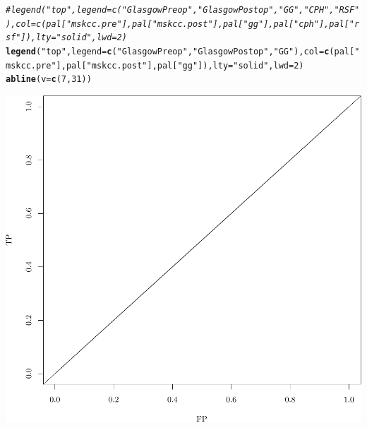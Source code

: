 \documentclass{article}\usepackage[]{graphicx}\usepackage[]{color}
\makeatletter
\def\maxwidth{ %
  \ifdim\Gin@nat@width>\linewidth
    \linewidth
  \else
    \Gin@nat@width
  \fi
}
\newcommand{\hlnum}[1]{\textcolor[rgb]{0.686,0.059,0.569}{#1}}%
\newcommand{\hlstr}[1]{\textcolor[rgb]{0.192,0.494,0.8}{#1}}%
\newcommand{\hlcom}[1]{\textcolor[rgb]{0.678,0.584,0.686}{\textit{#1}}}%
\newcommand{\hlstd}[1]{\textcolor[rgb]{0.345,0.345,0.345}{#1}}%
\newcommand{\hlkwc}[1]{\textcolor[rgb]{0.333,0.667,0.333}{#1}}%
\newcommand{\hlkwd}[1]{\textcolor[rgb]{0.737,0.353,0.396}{\textbf{#1}}}%
\newenvironment{kframe}{%
 \def\at@end@of@kframe{}%
 \ifinner\ifhmode%
  \def\at@end@of@kframe{\end{minipage}}%
  \begin{minipage}{\columnwidth}%
 \fi\fi%
 \def\FrameCommand##1{\hskip\@totalleftmargin \hskip-\fboxsep
 \colorbox{shadecolor}{##1}\hskip-\fboxsep
     \hskip-\linewidth \hskip-\@totalleftmargin \hskip\columnwidth}%
 \MakeFramed {\advance\hsize-\width
   \@totalleftmargin\z@ \linewidth\hsize
   \@setminipage}}%
 {\par\unskip\endMakeFramed%
 \at@end@of@kframe}
\newenvironment{knitrout}{}{} %
\makeatother
\begin{document}
\begin{knitrout}
\begin{kframe}
\begin{alltt}
\hlcom{# legend("top", legend = c("Glasgow Preop", "Glasgow Postop", "GG", "CPH", "RSF"), col = c(pal["mskcc.pre"], pal["mskcc.post"], pal["gg"], pal["cph"], pal["rsf"]), lty = "solid", lwd = 2)}
\hlkwd{legend}\hlstd{(}\hlstr{"top"}\hlstd{,} \hlkwc{legend} \hlstd{=} \hlkwd{c}\hlstd{(}\hlstr{"Glasgow Preop"}\hlstd{,} \hlstr{"Glasgow Postop"}\hlstd{,} \hlstr{"GG"}\hlstd{),} \hlkwc{col} \hlstd{=} \hlkwd{c}\hlstd{(pal[}\hlstr{"mskcc.pre"}\hlstd{], pal[}\hlstr{"mskcc.post"}\hlstd{], pal[}\hlstr{"gg"}\hlstd{]),} \hlkwc{lty} \hlstd{=} \hlstr{"solid"}\hlstd{,} \hlkwc{lwd} \hlstd{=} \hlnum{2}\hlstd{)}
\hlkwd{abline}\hlstd{(}\hlkwc{v} \hlstd{=} \hlkwd{c}\hlstd{(}\hlnum{7}\hlstd{,} \hlnum{31}\hlstd{))}
\end{alltt}
\end{kframe}

{\centering \includegraphics[width=\maxwidth]{figure/05-risksetROC-1} 

}



\end{knitrout}
\end{document}
